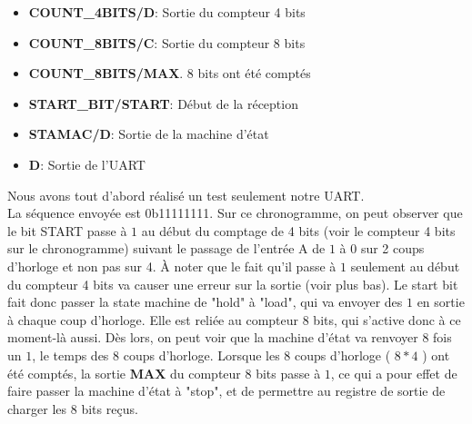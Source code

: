 \documentclass[a4paper]{article} %
\begin{document}
\begin{tcolorbox}[colframe=Monokaimagenta,colback=white]
\begin{itemize}
    \item     \textbf{COUNT\_4BITS/D}: Sortie du compteur 4 bits
    \item     \textbf{COUNT\_8BITS/C}: Sortie du compteur 8 bits
    \item     \textbf{COUNT\_8BITS/MAX}. 8 bits ont été comptés
    \item     \textbf{START\_BIT/START}: Début de la réception
    \item     \textbf{STAMAC/D}: Sortie de la machine d'état
    \item     \textbf{D}: Sortie de l'UART
\end{itemize}
Nous avons tout d'abord réalisé un test seulement notre UART.\\
La séquence envoyée est 0b11111111. Sur ce chronogramme, on peut observer que le bit START passe à $1$ au début du comptage de 4 bits (voir le compteur 4 bits sur le chronogramme) suivant le passage de l'entrée A de $1$ à $0$ sur 2 coups d'horloge et non pas sur 4. À noter que le fait qu'il passe à $1$ seulement au début du compteur 4 bits va causer une erreur sur la sortie (voir plus bas).
Le start bit fait donc passer la state machine de "hold" à "load", qui va envoyer des $1$ en sortie à chaque coup d'horloge. Elle est reliée au compteur 8 bits, qui s'active donc à ce moment-là aussi. Dès lors, on peut voir que la machine d'état va renvoyer 8 fois un $1$, le temps des 8 coups d'horloge. Lorsque les 8 coups d'horloge ( $8*4$ ) ont été comptés, la sortie \textbf{MAX} du compteur 8 bits passe à $1$, ce qui a pour effet de faire passer la machine d'état à "stop", et de permettre au registre de sortie de charger les 8 bits reçus.
\end{tcolorbox}
\end{document}
